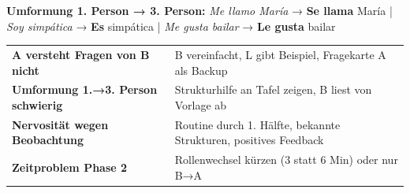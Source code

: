 \documentclass[11pt, a4paper]{article}
\begin{document}

\begin{tcolorbox}[
    colback=white,
    colframe=spanisch,
    title={\footnotesize\bfseries Strukturhilfe (Tafelanschrieb)},
    fonttitle=\bfseries,
    boxrule=0.5pt,
    top=2pt, bottom=2pt, left=4pt, right=4pt
]
\footnotesize
\textbf{Umformung 1. Person → 3. Person:}
\hspace{1cm}
\textit{Me llamo María} → \textbf{Se llama} María
\hspace{0.5cm}|\hspace{0.5cm}
\textit{Soy simpática} → \textbf{Es} simpática
\hspace{0.5cm}|\hspace{0.5cm}
\textit{Me gusta bailar} → \textbf{Le gusta} bailar
\end{tcolorbox}

\vspace{0.2cm}


\begin{tcolorbox}[
    colback=white,
    colframe=wichtig,
    title={\footnotesize\bfseries Erwartete Schwierigkeiten},
    fonttitle=\bfseries,
    boxrule=0.5pt,
    top=2pt, bottom=2pt, left=4pt, right=4pt
]
\footnotesize
\begin{tabularx}{\textwidth}{@{}p{4cm}X@{}}
\textbf{A versteht Fragen von B nicht} & B vereinfacht, L gibt Beispiel, Fragekarte A als Backup \\
\textbf{Umformung 1.→3. Person schwierig} & Strukturhilfe an Tafel zeigen, B liest von Vorlage ab \\
\textbf{Nervosität wegen Beobachtung} & Routine durch 1. Hälfte, bekannte Strukturen, positives Feedback \\
\textbf{Zeitproblem Phase 2} & Rollenwechsel kürzen (3 statt 6 Min) oder nur B→A \\
\end{tabularx}
\end{tcolorbox}
\end{document}
